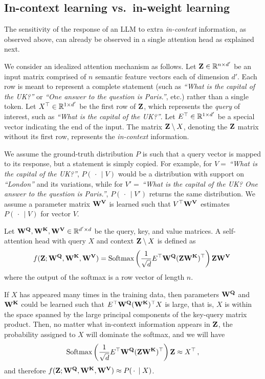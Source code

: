 \documentclass[a4paper]{article}
\theoremstyle{plain}
\theoremstyle{definition}
\theoremstyle{plain}
\begin{document}
\subsection{In-context learning vs.\ in-weight learning}
\label{sec:in-context-vs-in-weight}

The sensitivity of the response of an LLM to extra \textit{in-context} information, as observed above, can already be observed in a single attention head as explained next. 

We consider an idealized attention mechanism as follows. Let ${\mathbf{Z}}\in {\mathbb{R}}^{n\times d'}$ be an input  matrix comprised of $n$ semantic feature vectors each of dimension $d'$. Each row is meant to represent a complete statement (such as \emph{``What is the capital of the UK?''} or \emph{``One answer to the question is Paris.''}, etc.) rather than a single token. Let $X^\top\in{\mathbb{R}}^{1\times d'}$ be the first row of ${\mathbf{Z}}$, which represents the \emph{query} of interest, such as \emph{``What is the capital of the UK?''}. Let $E^\top \in{\mathbb{R}}^{1\times d'}$ be a special vector indicating the end of the input. The matrix ${\mathbf{Z}}\setminus X$, denoting the ${\mathbf{Z}}$ matrix without its first row, represents the \emph{in-context} information. 

We assume the ground-truth distribution $P$ is such that a query vector is mapped to its response, but a statement is simply copied. For example, for $V=\,$\emph{``What is the capital of the UK?''}, $P(\, \cdot \,\mid V)$ would be a distribution with support on \emph{``London''} and its variations, while for $V'=\,$\emph{``What is the capital of the UK? One answer to the question is Paris.''}, $P(\, \cdot \, \mid V')$ returns the same distribution. We assume a parameter matrix ${\mathbf{W^V}}$ is learned such that $V^\top {\mathbf{W^V}}$ estimates $P(\, \cdot \,\mid V)$ for vector $V$.

Let ${\mathbf{W^Q}},{\mathbf{W^K}},{\mathbf{W^V}}\in{\mathbb{R}}^{d'\times d}$ be the query, key, and value matrices. A self-attention head with query $X$ and context ${\mathbf{Z}}\setminus X$ is defined as
\[
f({\mathbf{Z}}; {\mathbf{W^Q}},{\mathbf{W^K}},{\mathbf{W^V}}) = \text{Softmax}\left( \frac{1}{\sqrt{d}} E^\top {\mathbf{W^Q}} ({\mathbf{Z}} {\mathbf{W^K}})^\top  \right) {\mathbf{Z}} {\mathbf{W^V}} \;
\]
where the output of the softmax is a row vector of length $n$.

If $X$ has appeared many times in the training data, then parameters ${\mathbf{W^Q}}$ and ${\mathbf{W^K}}$ could be learned such that $E^\top  {\mathbf{W^Q}} ({\mathbf{W^K}})^\top X$ is large, that is, $X$ is within the space spanned by the large principal components of the key-query matrix product. Then, no matter what in-context information appears in ${\mathbf{Z}}$, the probability assigned to $X$ will dominate the softmax, and we will have 
\[
\text{Softmax}\left( \frac{1}{\sqrt{d}} E^\top {\mathbf{W^Q}} ({\mathbf{Z}} {\mathbf{W^K}})^\top  \right) {\mathbf{Z}} \approx X^\top \,,
\]
and therefore $f({\mathbf{Z}}; {\mathbf{W^Q}},{\mathbf{W^K}},{\mathbf{W^V}}) \approx P(\, \cdot \, \mid X)$. 
\end{document}
